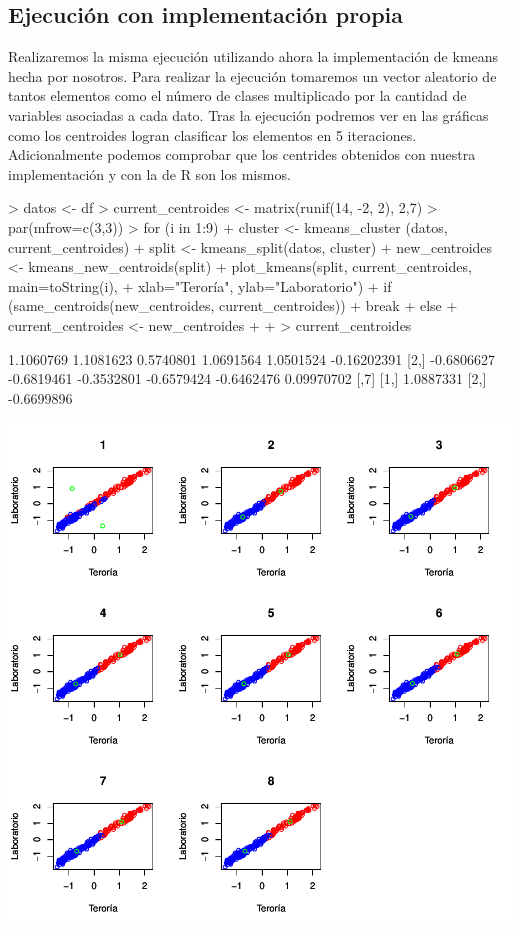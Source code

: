 \documentclass [a4paper] {article}
\begin{document}
\subsection{Ejecución con implementación propia}
Realizaremos la misma ejecución utilizando ahora la implementación de kmeans hecha por nosotros.
Para realizar la ejecución tomaremos un vector aleatorio de tantos elementos como el número de clases multiplicado por la cantidad de variables asociadas a cada dato.
Tras la ejecución podremos ver en las gráficas como los centroides logran clasificar los elementos en 5 iteraciones.
Adicionalmente podemos comprobar que los centrides obtenidos con nuestra implementación y con la de R son los mismos.
\begin{center}
\begin{Schunk}
\begin{Sinput}
> datos <- df
> current_centroides <- matrix(runif(14, -2, 2), 2,7)
> par(mfrow=c(3,3))
> for (i in 1:9){
+   cluster <- kmeans_cluster (datos, current_centroides)
+   split <- kmeans_split(datos, cluster)
+   new_centroides <- kmeans_new_centroids(split)
+   plot_kmeans(split, current_centroides, main=toString(i),
+               xlab="Teroría", ylab="Laboratorio")
+   if (same_centroids(new_centroides, current_centroides)){
+     break
+   }else{
+     current_centroides <- new_centroides
+   }
+ }
> current_centroides
\end{Sinput}
\begin{Soutput}
           [,1]       [,2]       [,3]       [,4]       [,5]        [,6]
[1,]  1.1060769  1.1081623  0.5740801  1.0691564  1.0501524 -0.16202391
[2,] -0.6806627 -0.6819461 -0.3532801 -0.6579424 -0.6462476  0.09970702
           [,7]
[1,]  1.0887331
[2,] -0.6699896
\end{Soutput}
\end{Schunk}
\includegraphics{entrega-kmeans_our_implementation}
\end{center}
\end{document}
